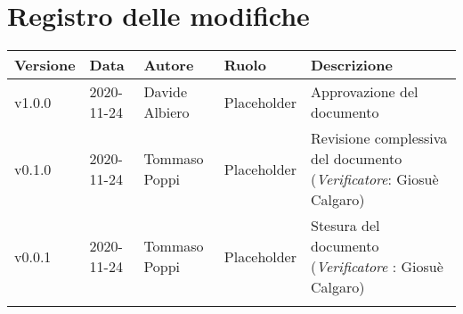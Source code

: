 \section*{\hfil Registro delle modifiche \hfil}
{
	\newlength{\freewidth}
	\setlength{\freewidth}{\dimexpr\textwidth-10\tabcolsep}
	\renewcommand{\arraystretch}{1.5}
	\centering
	\setlength{\aboverulesep}{0pt}
	\setlength{\belowrulesep}{0pt}
	\begin{longtable}{C{.131777\freewidth} C{.134036\freewidth} C{.263554\freewidth} C{.188254\freewidth} C{.282379\freewidth}}
		\toprule 
		\textbf{Versione} & \textbf{Data} & \textbf{Autore} & \textbf{Ruolo} & \textbf{Descrizione}\\
		\toprule
		\endhead
		
		v1.0.0 & 2020-11-24 &Davide Albiero & Placeholder & Approvazione del documento \\  
		v0.1.0 & 2020-11-24 & Tommaso Poppi & Placeholder & Revisione complessiva del documento (\textit{Verificatore}: Giosuè Calgaro) \\ 
		v0.0.1 & 2020-11-24 & Tommaso Poppi & Placeholder & Stesura del documento (\textit{Verificatore} : Giosuè Calgaro) \\
		
		
		\bottomrule
		\hiderowcolors
	\end{longtable}
}
